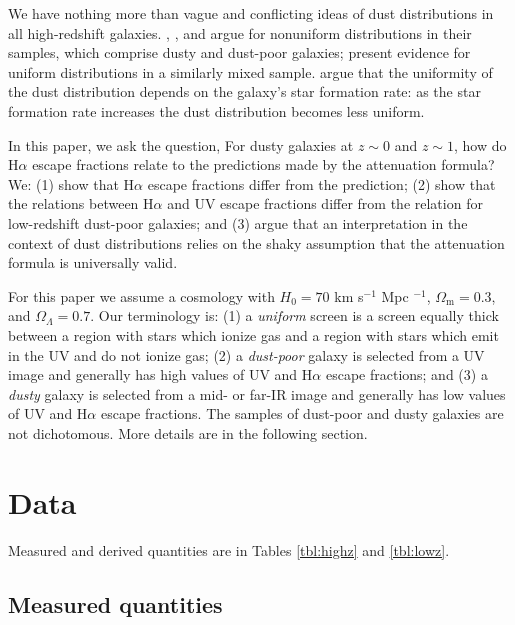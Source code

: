 \documentclass[referee]{aa}
\begin{document}
We have nothing more than vague and conflicting ideas of dust distributions in
all high-redshift galaxies.  \citet{onodera10}, \citet{kashino13}, and 
\citet{price13} argue for nonuniform distributions in their samples, which
comprise dusty and dust-poor galaxies; \citet{erb06} present evidence for
uniform distributions in a similarly mixed sample.  \citet{reddy15} argue
that the uniformity of the dust distribution depends on the galaxy's
star formation rate: as the star formation rate increases the dust distribution
becomes less uniform.

In this paper, we ask the question, For dusty galaxies at $z \sim 0$ and
$z \sim 1$, how do H$\alpha$ escape fractions relate to the predictions made by
the \citet{calzetti00} attenuation formula?  We: (1) show that H$\alpha$
escape fractions differ from
the prediction; (2) show that the relations between H$\alpha$ and UV
escape fractions differ from the relation for low-redshift dust-poor galaxies; and
(3) argue that an interpretation in the context of dust distributions relies on
the shaky assumption that the \citet{calzetti00} attenuation formula is
universally valid.

For this paper we assume a cosmology with $H_{0} = 70$ km s$^{-1}$ Mpc $^{-1}$,
$\Omega_{\mathrm{m}} = 0.3$, and $\Omega_{\Lambda} = 0.7$.  Our terminology
is: (1) a \emph{uniform} screen is a screen equally thick between a region with
stars which ionize gas and a region with stars which emit in the UV and do not
ionize gas; (2) a \emph{dust-poor} galaxy is selected from a UV image and
generally has high values of UV and
H$\alpha$ escape fractions; and (3) a \emph{dusty} galaxy is selected from a
mid- or far-IR
image and generally has low values of UV and H$\alpha$ escape fractions.  The
samples of dust-poor and dusty galaxies are not
dichotomous.  More details are in the following section.

\section{Data}\label{sec:data}

Measured and derived quantities are in Tables \ref{tbl:highz} and
\ref{tbl:lowz}.

\subsection{Measured quantities}
\end{document}
